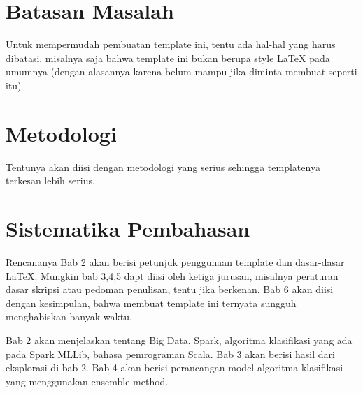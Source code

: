 \section{Batasan Masalah}
\label{sec:batasan}
Untuk mempermudah pembuatan template ini, tentu ada hal-hal yang harus dibatasi, misalnya saja bahwa template ini bukan berupa style \LaTeX{} pada umumnya (dengan alasannya karena belum mampu jika diminta membuat seperti itu)


\section{Metodologi}
\label{sec:metlit}
Tentunya akan diisi dengan metodologi yang serius sehingga templatenya terkesan lebih serius.


\section{Sistematika Pembahasan}
\label{sec:sispem}
Rencananya Bab 2 akan berisi petunjuk penggunaan template dan dasar-dasar \LaTeX.
Mungkin bab 3,4,5 dapt diisi oleh ketiga jurusan, misalnya peraturan dasar skripsi atau pedoman penulisan, tentu jika berkenan.
Bab 6 akan diisi dengan kesimpulan, bahwa membuat template ini ternyata sungguh menghabiskan banyak waktu.

Bab 2 akan menjelaskan tentang Big Data, Spark, algoritma klasifikasi yang ada pada Spark MLLib, bahasa pemrograman Scala.
Bab 3 akan berisi hasil dari eksplorasi di bab 2.
Bab 4 akan berisi perancangan model algoritma klasifikasi yang menggunakan ensemble method.
 